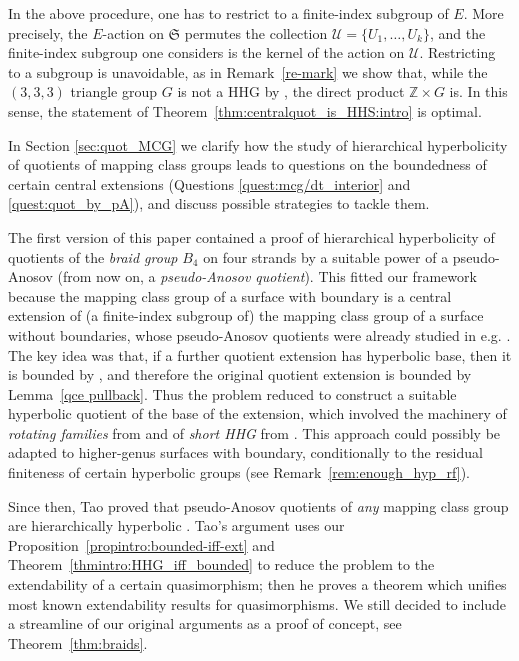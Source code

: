 \documentclass[svgnames]{amsart}
\theoremstyle{plain}
\theoremstyle{definition}
\newcommand{\Z}{\mathbb{Z}}
\newcommand{\frakS}{\mathfrak{S}}
\begin{document}
In the above procedure, one has to restrict to a finite-index subgroup of $E$. More precisely, the $E$-action on $\frakS$ permutes the collection $\mathcal U=\{U_1,\ldots, U_k\}$, and the finite-index subgroup one considers is the kernel of the action on $\mathcal U$. Restricting to a subgroup is unavoidable, as in Remark~\ref{re-mark} we show that, while the $(3,3,3)$ triangle group $G$ is not a HHG by \cite{PS_unbounded}, the direct product $\Z\times G$ is. In this sense, the statement of Theorem~\ref{thm:centralquot_is_HHS:intro} is optimal.

\par\medskip
In Section \ref{sec:quot_MCG} we clarify how the study of hierarchical hyperbolicity of quotients of mapping class groups leads to questions on the boundedness of certain central extensions (Questions \ref{quest:mcg/dt_interior} and \ref{quest:quot_by_pA}), and discuss possible strategies to tackle them.

    The first version of this paper contained a proof of hierarchical hyperbolicity of quotients of the \emph{braid group} $B_4$ on four strands by a suitable power of a pseudo-Anosov (from now on, a \emph{pseudo-Anosov quotient}). This fitted our framework because the mapping class group of a surface with boundary is a central extension of (a finite-index subgroup of) the mapping class group of a surface without boundaries, whose pseudo-Anosov quotients were already studied in e.g. \cite{DGO,hhs_asdim}. The key idea was that, if a further quotient extension has hyperbolic base, then it is bounded by \cite{neumannreeves}, and therefore the original quotient extension is bounded by Lemma~\ref{qce pullback}. Thus the problem reduced to construct a suitable hyperbolic quotient of the base of the extension, which involved the machinery of \emph{rotating families} from \cite{dahmani:rotating} and of \emph{short HHG} from \cite{short_HHG:I}. This approach could possibly be adapted to higher-genus surfaces with boundary, conditionally to the residual finiteness of certain hyperbolic groups (see Remark~\ref{rem:enough_hyp_rf}).
    
    Since then, Tao proved that pseudo-Anosov quotients of \emph{any} mapping class group are hierarchically hyperbolic \cite[Corollary 1.7]{tao2025extensiontheoremquasimorphisms}. Tao's argument uses our Proposition~\ref{propintro:bounded-iff-ext} and Theorem~\ref{thmintro:HHG_iff_bounded} to reduce the problem to the extendability of a certain quasimorphism; then he proves a theorem which unifies most known extendability results for quasimorphisms. We still decided to include a streamline of our original arguments as a proof of concept, see Theorem~\ref{thm:braids}.
\end{document}
